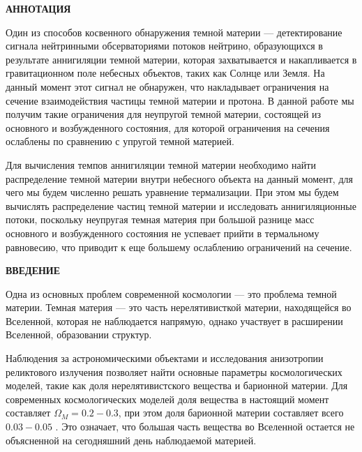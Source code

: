 \newpage
\begin{center}
  \textbf{\large АННОТАЦИЯ}
\end{center}

Один из способов косвенного обнаружения темной материи --- детектирование сигнала нейтринными обсерваториями потоков нейтрино, образующихся в результате аннигиляции темной материи, которая захватывается и накапливается  в гравитационном поле небесных объектов, таких как Солнце или Земля. На данный момент этот сигнал не обнаружен, что накладывает ограничения на сечение взаимодействия частицы темной материи и протона. В данной работе мы получим такие ограничения для неупругой темной материи, состоящей из основного и возбужденного состояния, для которой ограничения на сечения ослаблены по сравнению с упругой темной материей. 

Для вычисления темпов аннигиляции темной материи необходимо найти распределение темной материи внутри небесного объекта на данный момент, для чего мы будем численно решать уравнение термализации. При этом мы будем вычислять распределение частиц темной материи и исследовать аннигиляционные потоки, поскольку неупругая темная материя при большой разнице масс основного и возбужденного состояния не успевает прийти в термальному равновесию, что приводит к еще большему ослаблению ограничений на сечение.

\onehalfspacing
\setcounter{page}{2}

\newpage
\renewcommand{\contentsname}{\centerline{\large СОДЕРЖАНИЕ}}
\tableofcontents

\newpage
\begin{center}
  \textbf{\large ВВЕДЕНИЕ}
\end{center}


Одна из основных проблем современной космологии --- это проблема темной материи.  Темная материя --- это часть нерелятивисткой материи, находящейся во Вселенной, которая не наблюдается напрямую, однако участвует в расширении Вселенной, образовании структур. 


Наблюдения за астрономическими объектами и исследования анизотропии реликтового излучения позволяет найти основные параметры космологических моделей, такие как доля нерелятивистского вещества и барионной материи. Для современных космологических моделей доля вещества в настоящий момент составляет $\Omega_M = 0.2-0.3$, при этом доля барионной материи составляет всего $0.03-0.05$ \cite{Cao_2023}. Это означает, что большая часть вещества во Вселенной остается не объясненной на сегодняшний день наблюдаемой материей.


